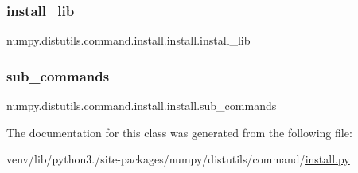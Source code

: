 \subsubsection{\texorpdfstring{install\+\_\+lib}{install\_lib}}
{\footnotesize\ttfamily numpy.\+distutils.\+command.\+install.\+install.\+install\+\_\+lib}

\mbox{\label{classnumpy_1_1distutils_1_1command_1_1install_1_1install_a4163a16f09c9d7095457776042a7b6b0}} 
\subsubsection{\texorpdfstring{sub\+\_\+commands}{sub\_commands}}
{\footnotesize\ttfamily numpy.\+distutils.\+command.\+install.\+install.\+sub\+\_\+commands\hspace{0.3cm}{\ttfamily [static]}}



The documentation for this class was generated from the following file\+:\begin{DoxyCompactItemize}
\item 
venv/lib/python3./site-\/packages/numpy/distutils/command/\hyperlink{numpy_2distutils_2command_2install_8py}{install.\+py}\end{DoxyCompactItemize}

